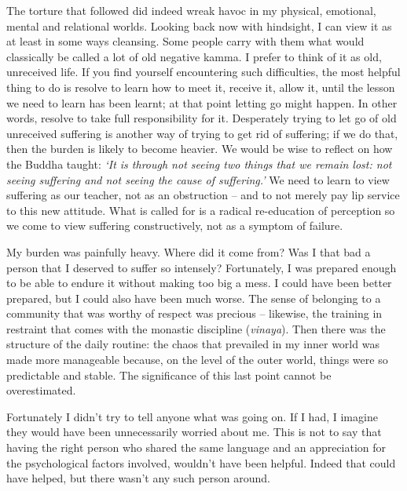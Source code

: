 The torture that followed did indeed wreak havoc in my physical,
emotional, mental and relational worlds. Looking back now with
hindsight, I can view it as at least in some ways cleansing. Some people
carry with them what would classically be called a lot of old negative
kamma. I prefer to think of it as old, unreceived life. If you find
yourself encountering such difficulties, the most helpful thing to do is
resolve to learn how to meet it, receive it, allow it, until the lesson
we need to learn has been learnt; at that point letting go might happen.
In other words, resolve to take full responsibility for it. Desperately
trying to let go of old unreceived suffering is another way of trying to
get rid of suffering; if we do that, then the burden is likely to become
heavier. We would be wise to reflect on how the Buddha taught: \emph{`It
is through not seeing two things that we remain lost: not seeing
suffering and not seeing the cause of suffering.'} We need to learn to
view suffering as our teacher, not as an obstruction -- and to not
merely pay lip service to this new attitude. What is called for is a
radical re-education of perception so we come to view suffering
constructively, not as a symptom of failure.

My burden was painfully heavy. Where did it come from? Was I that bad a
person that I deserved to suffer so intensely? Fortunately, I was
prepared enough to be able to endure it without making too big a mess. I
could have been better prepared, but I could also have been much worse.
The sense of belonging to a community that was worthy of respect was
precious -- likewise, the training in restraint that comes with the
monastic discipline (\emph{vinaya}). Then there was the structure of the
daily routine: the chaos that prevailed in my inner world was made more
manageable because, on the level of the outer world, things were so
predictable and stable. The significance of this last point cannot be
overestimated.

Fortunately I didn't try to tell anyone what was going on. If I had, I
imagine they would have been unnecessarily worried about me. This is not
to say that having the right person who shared the same language and an
appreciation for the psychological factors involved, wouldn't have been
helpful. Indeed that could have helped, but there wasn't any such person
around.

